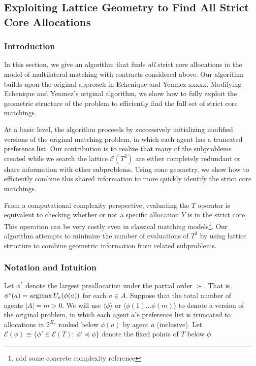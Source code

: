 \documentclass[11pt,reqno]{amsart}
\theoremstyle{definition}
\numberwithin{equation}{section}
\newcommand{\argmax}{\operatornamewithlimits{argmax}}
\newcommand{\pre}{\phi}
\newcommand{\fix}{\mathcal{E}}
\newcommand{\peq}{\preceq}
\newcommand{\su}{\succ}
\begin{document}
\subsection{Exploiting Lattice Geometry to Find All Strict Core Allocations}
\subsubsection{Introduction}
In this section, we give an algorithm that finds \emph{all} strict core allocations in the model of multilateral matching with contracts considered above.
Our algorithm builds upon the original approach in Echenique and Yenmez xxxxx.
Modifying Echenique and Yenmez's original algorithm, we show how to fully exploit the geometric structure of the problem to efficiently find the full set of strict core matchings. 

At a basic level, the algorithm proceeds by successively initializing modified versions of the original matching problem, in which each agent has a truncated preference list.
Our contribution is to realize that many of the subproblems created while we search the lattice $\fix(T^2)$  are either completely redundant or share information with other subproblems.
Using cone geometry, we show how to efficiently combine this shared information to more quickly identify the strict core matchings. 

From a computational complexity perspective, evaluating the $T$ operator is equivalent to checking whether or not a specific allocation $Y$ is in the strict core.
This operation can be very costly even in classical matching models\footnote{add some concrete complexity reference}.
Our algorithm attempts to minimize the number of evaluations of $T^2$ by using lattice structure to combine geometric information from related subproblems. 

\subsubsection{Notation and Intuition} 
Let $\pre^*$ denote the largest preallocation under the partial order $\su$.
That is, $\pre^*(a) = \argmax U_a(\pre(a))$ for each $a \in A$.
Suppose that the total number of agents $|A| = m > 0$.
We will use $\langle \pre \rangle$ or $\langle \pre(1) \hdots \pre(m) \rangle$  to denote a version of the original problem, in which each agent $a$'s preference list is truncated to allocations in $2^{X_a}$ ranked below $\pre(a)$ by agent $a$ (inclusive). 
Let $\fix(\pre) \equiv \{\pre' \in \fix(T): \: \pre' \peq \pre\}$ denote the fixed points of $T$ below $\pre$.  
\end{document}

